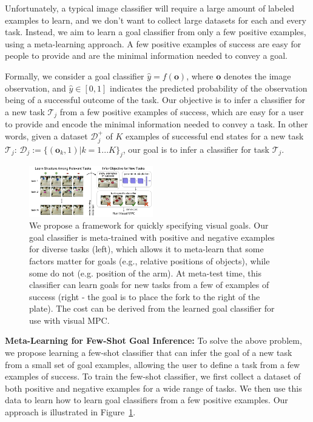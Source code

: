 Unfortunately, a typical image classifier will require a large amount of labeled examples to learn, and we don't want to collect large datasets for each and every task. Instead, we aim to learn a goal classifier from only a few positive examples, using a meta-learning approach. A few positive examples of success are easy for people to provide and are the minimal information needed to convey a goal.

\newcommand{\task}{\mathcal{T}}
\newcommand{\data}{\mathcal{D}}
\newcommand{\obs}{\mathbf{o}}
\newcommand{\out}{y}
\newcommand{\posdata}{\data^+}
\newcommand{\testdata}{\data^\text{test}}
\newcommand{\loss}{\mathcal{L}}

Formally, we consider a goal classifier $\hat{\out} = f(\obs)$, where $\obs$ denotes the image observation, and $\hat{\out} \in [0,1]$ indicates the predicted probability of the observation being of a successful outcome of the task. Our objective is to infer a classifier for a new task $\task_j$ from a few positive examples of success, which are easy for a user to provide and encode the minimal information needed to convey a task. In other words, given a dataset $\posdata_j$ of $K$ examples of successful end states for a new task $\task_j$: $\data_j:=\{(\obs_k, 1) | k = 1...K\}_j$, our goal is to infer a classifier for task $\task_j$. 

\begin{figure}
    \centering
    \includegraphics[width=0.48\textwidth]{images_cls/cls_fig.jpeg}
    \caption{\small We propose a framework for quickly specifying visual goals. Our goal classifier is meta-trained with positive and negative examples for diverse tasks (left), which allows it to meta-learn that some factors matter for goals (e.g., relative positions of objects), while some do not (e.g. position of the arm). At meta-test time, this classifier can learn goals for new tasks from a few of examples of success (right - the goal is to place the fork to the right of the plate). The cost can be derived from the learned goal classifier for use with visual MPC.}
    \label{fig:cls_fig}
    \vspace{-0.3cm}
\end{figure}

\noindent \textbf{Meta-Learning for Few-Shot Goal Inference:}
To solve the above problem, we propose learning a few-shot classifier that can infer the goal of a new task from a small set of goal examples, allowing the user to define a task from a few examples of success. To train the few-shot classifier, we first collect a dataset of both positive and negative examples for a wide range of tasks. We then use this data to learn how to learn goal classifiers from a few positive examples.
Our approach is illustrated in Figure~\ref{fig:cls_fig}.

